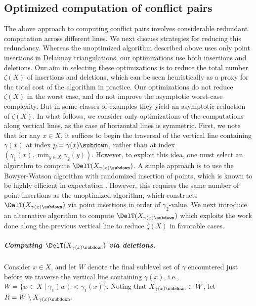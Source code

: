 \subsection{Optimized computation of conflict pairs}
\label{Sec:Optimizations}
The above approach to computing conflict pairs involves considerable redundant computation across different lines.  We next discuss strategies for reducing this redundancy.    Whereas the unoptimized algorithm described above uses only point insertions in Delaunay triangulations, our optimizations use both insertions and deletions.  Our aim in selecting these optimizations is to reduce  the total number $\zeta(X)$ of insertions and deletions, which can be seen heuristically as a proxy for the total cost of the algorithm in practice.  Our optimizations do not reduce $\zeta(X)$ in the worst case, and do not improve the asymptotic worst-case complexity.
But in some classes of examples they yield an asymptotic reduction of $\zeta(X)$.%
%
In what follows, we consider only optimizations of the computations along vertical lines, as the case of horizontal lines is symmetric.  First, we note that for any $x\in X$, it suffices to begin the traversal of the vertical line containing $\gamma(x)$ at index $p=\gamma(x){\subdown}$, rather than at index $(\gamma_1(x),\min_{y\in X}\gamma_2(y))$.  However, to exploit this idea, one must select an algorithm to compute $\DelT(X_{\gamma(x){\subdown}})$.  A simple approach is to use the Bowyer-Watson algorithm with randomized insertion of points, which is known to be highly efficient in expectation \cite{Clarkson1989}.  However, this requires the same number of point insertions as the unoptimized algorithm, which constructs $\DelT(X_{\gamma(x){\subdown}})$ via point insertions in order of $\gamma_2$-value.  
We next introduce an alternative algorithm to compute $\DelT(X_{\gamma(x){\subdown}})$ which exploits the work done along the previous vertical line to reduce $\zeta(X)$ in favorable cases.
%
%
\subparagraph{Computing $\DelT(X_{\gamma(x){\subdown}})$ via deletions.}
Consider $x\in X$, and let $W$ denote the final sublevel set of $\gamma$ encountered just before we traverse the vertical line containing $\gamma(x)$, i.e., $W=\{w\in X\mid \gamma_1(w)<\gamma_1(x)\}$.  Noting that $X_{\gamma(x){\subdown}}\subset W$, let $R= W \setminus X_{\gamma(x){\subdown}}.$
